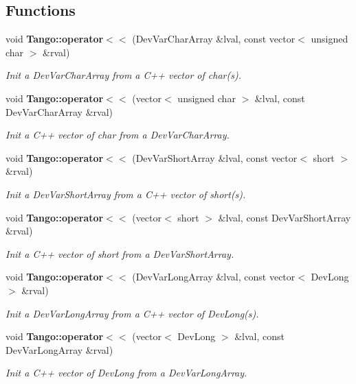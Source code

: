 \subsection*{Functions}
\begin{DoxyCompactItemize}
\item 
void {\bf Tango\-::operator$<$$<$} (Dev\-Var\-Char\-Array \&lval, const vector$<$ unsigned char $>$ \&rval)
\begin{DoxyCompactList}\small\item\em Init a Dev\-Var\-Char\-Array from a C++ vector of char(s). \end{DoxyCompactList}\item 
void {\bf Tango\-::operator$<$$<$} (vector$<$ unsigned char $>$ \&lval, const Dev\-Var\-Char\-Array \&rval)
\begin{DoxyCompactList}\small\item\em Init a C++ vector of char from a Dev\-Var\-Char\-Array. \end{DoxyCompactList}\item 
void {\bf Tango\-::operator$<$$<$} (Dev\-Var\-Short\-Array \&lval, const vector$<$ short $>$ \&rval)
\begin{DoxyCompactList}\small\item\em Init a Dev\-Var\-Short\-Array from a C++ vector of short(s). \end{DoxyCompactList}\item 
void {\bf Tango\-::operator$<$$<$} (vector$<$ short $>$ \&lval, const Dev\-Var\-Short\-Array \&rval)
\begin{DoxyCompactList}\small\item\em Init a C++ vector of short from a Dev\-Var\-Short\-Array. \end{DoxyCompactList}\item 
void {\bf Tango\-::operator$<$$<$} (Dev\-Var\-Long\-Array \&lval, const vector$<$ Dev\-Long $>$ \&rval)
\begin{DoxyCompactList}\small\item\em Init a Dev\-Var\-Long\-Array from a C++ vector of Dev\-Long(s). \end{DoxyCompactList}\item 
void {\bf Tango\-::operator$<$$<$} (vector$<$ Dev\-Long $>$ \&lval, const Dev\-Var\-Long\-Array \&rval)
\begin{DoxyCompactList}\small\item\em Init a C++ vector of Dev\-Long from a Dev\-Var\-Long\-Array. \end{DoxyCompactList}\item 

\end{DoxyCompactItemize}
